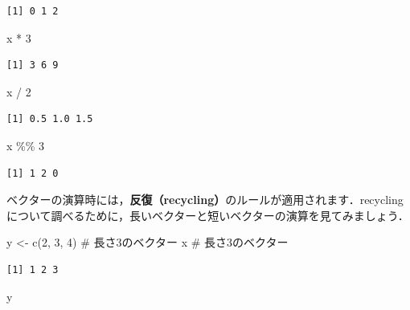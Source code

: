 \documentclass[
  letterpaper,
  DIV=11,
  numbers=noendperiod]{scrreprt}
\newenvironment{Shaded}{\begin{snugshade}}{\end{snugshade}}
\newcommand{\CommentTok}[1]{\textcolor[rgb]{0.37,0.37,0.37}{#1}}
\newcommand{\DecValTok}[1]{\textcolor[rgb]{0.68,0.00,0.00}{#1}}
\newcommand{\FunctionTok}[1]{\textcolor[rgb]{0.28,0.35,0.67}{#1}}
\newcommand{\NormalTok}[1]{\textcolor[rgb]{0.00,0.23,0.31}{#1}}
\newcommand{\OtherTok}[1]{\textcolor[rgb]{0.00,0.23,0.31}{#1}}
\newcommand{\SpecialCharTok}[1]{\textcolor[rgb]{0.37,0.37,0.37}{#1}}
\begin{document}
\begin{verbatim}
[1] 0 1 2
\end{verbatim}

\begin{Shaded}
\begin{Highlighting}[]
\NormalTok{x }\SpecialCharTok{*} \DecValTok{3}
\end{Highlighting}
\end{Shaded}

\begin{verbatim}
[1] 3 6 9
\end{verbatim}

\begin{Shaded}
\begin{Highlighting}[]
\NormalTok{x }\SpecialCharTok{/} \DecValTok{2}
\end{Highlighting}
\end{Shaded}

\begin{verbatim}
[1] 0.5 1.0 1.5
\end{verbatim}

\begin{Shaded}
\begin{Highlighting}[]
\NormalTok{x }\SpecialCharTok{\%\%} \DecValTok{3}
\end{Highlighting}
\end{Shaded}

\begin{verbatim}
[1] 1 2 0
\end{verbatim}

ベクターの演算時には，\textbf{反復（recycling）}のルールが適用されます．recyclingについて調べるために，長いベクターと短いベクターの演算を見てみましょう．

\begin{Shaded}
\begin{Highlighting}[]
\NormalTok{y }\OtherTok{\textless{}{-}} \FunctionTok{c}\NormalTok{(}\DecValTok{2}\NormalTok{, }\DecValTok{3}\NormalTok{, }\DecValTok{4}\NormalTok{) }\CommentTok{\# 長さ3のベクター}
\NormalTok{x }\CommentTok{\# 長さ3のベクター}
\end{Highlighting}
\end{Shaded}

\begin{verbatim}
[1] 1 2 3
\end{verbatim}

\begin{Shaded}
\begin{Highlighting}[]
\NormalTok{y}
\end{Highlighting}
\end{Shaded}
\end{document}
